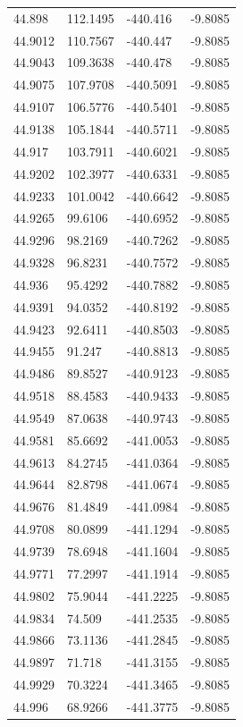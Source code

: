 \begin{table}[H]
\begin{tabular}{llll}
44.898 & 112.1495 & -440.416 & -9.8085 \\
44.9012 & 110.7567 & -440.447 & -9.8085 \\
44.9043 & 109.3638 & -440.478 & -9.8085 \\
44.9075 & 107.9708 & -440.5091 & -9.8085 \\
44.9107 & 106.5776 & -440.5401 & -9.8085 \\
44.9138 & 105.1844 & -440.5711 & -9.8085 \\
44.917 & 103.7911 & -440.6021 & -9.8085 \\
44.9202 & 102.3977 & -440.6331 & -9.8085 \\
44.9233 & 101.0042 & -440.6642 & -9.8085 \\
44.9265 & 99.6106 & -440.6952 & -9.8085 \\
44.9296 & 98.2169 & -440.7262 & -9.8085 \\
44.9328 & 96.8231 & -440.7572 & -9.8085 \\
44.936 & 95.4292 & -440.7882 & -9.8085 \\
44.9391 & 94.0352 & -440.8192 & -9.8085 \\
44.9423 & 92.6411 & -440.8503 & -9.8085 \\
44.9455 & 91.247 & -440.8813 & -9.8085 \\
44.9486 & 89.8527 & -440.9123 & -9.8085 \\
44.9518 & 88.4583 & -440.9433 & -9.8085 \\
44.9549 & 87.0638 & -440.9743 & -9.8085 \\
44.9581 & 85.6692 & -441.0053 & -9.8085 \\
44.9613 & 84.2745 & -441.0364 & -9.8085 \\
44.9644 & 82.8798 & -441.0674 & -9.8085 \\
44.9676 & 81.4849 & -441.0984 & -9.8085 \\
44.9708 & 80.0899 & -441.1294 & -9.8085 \\
44.9739 & 78.6948 & -441.1604 & -9.8085 \\
44.9771 & 77.2997 & -441.1914 & -9.8085 \\
44.9802 & 75.9044 & -441.2225 & -9.8085 \\
44.9834 & 74.509 & -441.2535 & -9.8085 \\
44.9866 & 73.1136 & -441.2845 & -9.8085 \\
44.9897 & 71.718 & -441.3155 & -9.8085 \\
44.9929 & 70.3224 & -441.3465 & -9.8085 \\
44.996 & 68.9266 & -441.3775 & -9.8085 \\

\end{tabular}
\end{table}
